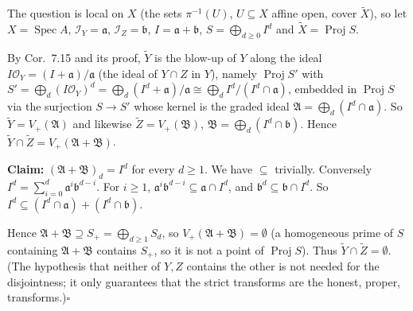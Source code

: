 \documentclass[11pt]{article}
\begin{document}
\pf
The question is local on $X$ (the sets $\pi^{-1}(U)$, $U\subseteq X$ affine open, cover $\tilde X$), so let $X=\operatorname{Spec}A$, $\mathcal I_Y=\mathfrak a$, $\mathcal I_Z=\mathfrak b$, $I=\mathfrak a+\mathfrak b$, $S=\bigoplus_{d\ge0}I^d$ and $\tilde X=\operatorname{Proj}S$.

By Cor.~7.15 and its proof, $\tilde Y$ is the blow-up of $Y$ along the ideal $I\mathcal O_Y=(I+\mathfrak a)/\mathfrak a$ (the ideal of $Y\cap Z$ in $Y$), namely $\operatorname{Proj}S'$ with $S'=\bigoplus_d(I\mathcal O_Y)^d=\bigoplus_d(I^d+\mathfrak a)/\mathfrak a\cong\bigoplus_dI^d/(I^d\cap\mathfrak a)$, embedded in $\operatorname{Proj}S$ via the surjection $S\to S'$ whose kernel is the graded ideal $\mathfrak A=\bigoplus_d(I^d\cap\mathfrak a)$. So $\tilde Y=V_+(\mathfrak A)$ and likewise $\tilde Z=V_+(\mathfrak B)$, $\mathfrak B=\bigoplus_d(I^d\cap\mathfrak b)$. Hence $\tilde Y\cap\tilde Z=V_+(\mathfrak A+\mathfrak B)$.

\textbf{Claim:} $(\mathfrak A+\mathfrak B)_d=I^d$ for every $d\ge1$. We have $\subseteq$ trivially. Conversely $I^d=\sum_{i=0}^d\mathfrak a^i\mathfrak b^{d-i}$. For $i\ge1$, $\mathfrak a^i\mathfrak b^{d-i}\subseteq\mathfrak a\cap I^d$, and $\mathfrak b^d\subseteq\mathfrak b\cap I^d$. So $I^d\subseteq(I^d\cap\mathfrak a)+(I^d\cap\mathfrak b)$.

Hence $\mathfrak A+\mathfrak B\supseteq S_+=\bigoplus_{d\ge1}S_d$, so $V_+(\mathfrak A+\mathfrak B)=\emptyset$ (a homogeneous prime of $S$ containing $\mathfrak A+\mathfrak B$ contains $S_+$, so it is not a point of $\operatorname{Proj}S$). Thus $\tilde Y\cap\tilde Z=\emptyset$. (The hypothesis that neither of $Y,Z$ contains the other is not needed for the disjointness; it only guarantees that the strict transforms are the honest, proper, transforms.)\hfill$\square$
\end{document}
